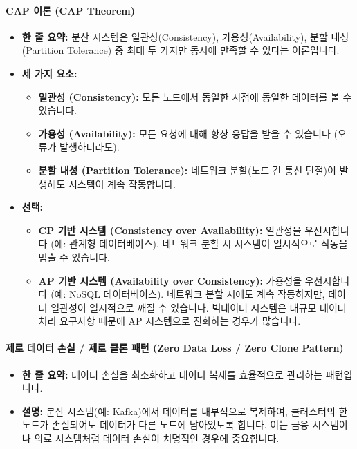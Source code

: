 \documentclass[11pt,a4paper]{article}
\theoremstyle{definition}
\begin{document}
\paragraph{CAP 이론 (CAP Theorem)}
\begin{itemize}
    \item \textbf{한 줄 요약:} 분산 시스템은 일관성(Consistency), 가용성(Availability), 분할 내성(Partition Tolerance) 중 최대 두 가지만 동시에 만족할 수 있다는 이론입니다.
    \item \textbf{세 가지 요소:}
    \begin{itemize}
        \item \textbf{일관성 (Consistency):} 모든 노드에서 동일한 시점에 동일한 데이터를 볼 수 있습니다.
        \item \textbf{가용성 (Availability):} 모든 요청에 대해 항상 응답을 받을 수 있습니다 (오류가 발생하더라도).
        \item \textbf{분할 내성 (Partition Tolerance):} 네트워크 분할(노드 간 통신 단절)이 발생해도 시스템이 계속 작동합니다.
    \end{itemize}
    \item \textbf{선택:}
    \begin{itemize}
        \item \textbf{CP 기반 시스템 (Consistency over Availability):} 일관성을 우선시합니다 (예: 관계형 데이터베이스). 네트워크 분할 시 시스템이 일시적으로 작동을 멈출 수 있습니다.
        \item \textbf{AP 기반 시스템 (Availability over Consistency):} 가용성을 우선시합니다 (예: NoSQL 데이터베이스). 네트워크 분할 시에도 계속 작동하지만, 데이터 일관성이 일시적으로 깨질 수 있습니다. 빅데이터 시스템은 대규모 데이터 처리 요구사항 때문에 AP 시스템으로 진화하는 경우가 많습니다.
    \end{itemize}
\end{itemize}

\paragraph{제로 데이터 손실 / 제로 클론 패턴 (Zero Data Loss / Zero Clone Pattern)}
\begin{itemize}
    \item \textbf{한 줄 요약:} 데이터 손실을 최소화하고 데이터 복제를 효율적으로 관리하는 패턴입니다.
    \item \textbf{설명:} 분산 시스템(예: Kafka)에서 데이터를 내부적으로 복제하여, 클러스터의 한 노드가 손실되어도 데이터가 다른 노드에 남아있도록 합니다. 이는 금융 시스템이나 의료 시스템처럼 데이터 손실이 치명적인 경우에 중요합니다.
\end{itemize}
\end{document}
